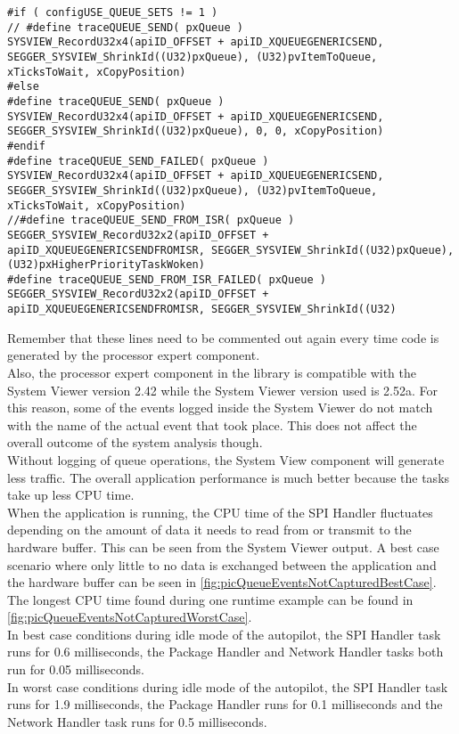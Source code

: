 \begin{lstlisting}
#if ( configUSE_QUEUE_SETS != 1 )
// #define traceQUEUE_SEND( pxQueue )                                    SYSVIEW_RecordU32x4(apiID_OFFSET + apiID_XQUEUEGENERICSEND, SEGGER_SYSVIEW_ShrinkId((U32)pxQueue), (U32)pvItemToQueue, xTicksToWait, xCopyPosition)
#else
#define traceQUEUE_SEND( pxQueue )                                    SYSVIEW_RecordU32x4(apiID_OFFSET + apiID_XQUEUEGENERICSEND, SEGGER_SYSVIEW_ShrinkId((U32)pxQueue), 0, 0, xCopyPosition)
#endif
#define traceQUEUE_SEND_FAILED( pxQueue )                             SYSVIEW_RecordU32x4(apiID_OFFSET + apiID_XQUEUEGENERICSEND, SEGGER_SYSVIEW_ShrinkId((U32)pxQueue), (U32)pvItemToQueue, xTicksToWait, xCopyPosition)
//#define traceQUEUE_SEND_FROM_ISR( pxQueue )                           SEGGER_SYSVIEW_RecordU32x2(apiID_OFFSET + apiID_XQUEUEGENERICSENDFROMISR, SEGGER_SYSVIEW_ShrinkId((U32)pxQueue), (U32)pxHigherPriorityTaskWoken)
#define traceQUEUE_SEND_FROM_ISR_FAILED( pxQueue )                    SEGGER_SYSVIEW_RecordU32x2(apiID_OFFSET + apiID_XQUEUEGENERICSENDFROMISR, SEGGER_SYSVIEW_ShrinkId((U32)
\end{lstlisting}
Remember that these lines need to be commented out again every time code is generated by the processor expert component.\\
Also, the processor expert component in the library is compatible with the System Viewer version 2.42 while the System Viewer version used is 2.52a. For this reason, some of the events logged inside the System Viewer do not match with the name of the actual event that took place. This does not affect the overall outcome of the system analysis though.\\
Without logging of queue operations, the System View component will generate less traffic. The overall application performance is much better because the tasks take up less CPU time.\\
When the application is running, the CPU time of the SPI Handler fluctuates depending on the amount of data it needs to read from or transmit to the hardware buffer. This can be seen from the System Viewer output. A best case scenario where only little to no data is exchanged between the application and the hardware buffer can be seen in \autoref{fig:picQueueEventsNotCapturedBestCase}. The longest CPU time found during one runtime example can be found in \autoref{fig:picQueueEventsNotCapturedWorstCase}.\\
In best case conditions during idle mode of the autopilot, the SPI Handler task runs for 0.6 milliseconds, the Package Handler and Network Handler tasks both run for 0.05 milliseconds.	\\
In worst case conditions during idle mode of the autopilot, the SPI Handler task runs for 1.9 milliseconds, the Package Handler runs for 0.1 milliseconds and the Network Handler task runs for 0.5 milliseconds.
%
%
%
%
%
%
%
